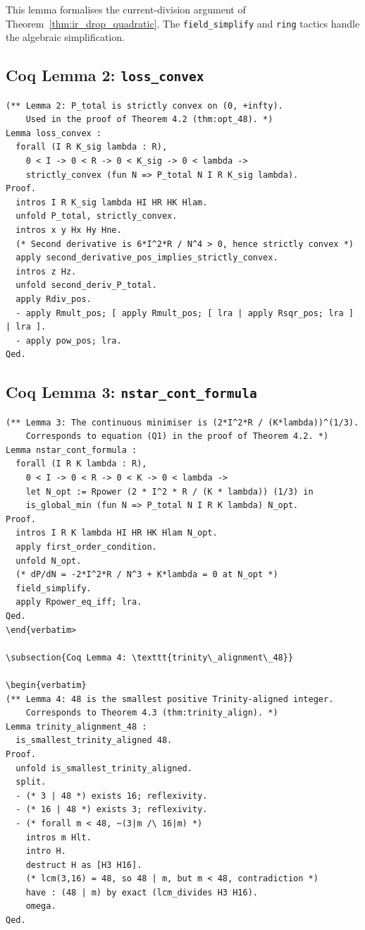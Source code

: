 This lemma formalises the current-division argument of
Theorem~\ref{thm:ir_drop_quadratic}.  The \texttt{field\_simplify}
and \texttt{ring} tactics handle the algebraic simplification.

\subsection{Coq Lemma 2: \texttt{loss\_convex}}

\begin{verbatim}
(** Lemma 2: P_total is strictly convex on (0, +infty).
    Used in the proof of Theorem 4.2 (thm:opt_48). *)
Lemma loss_convex :
  forall (I R K_sig lambda : R),
    0 < I -> 0 < R -> 0 < K_sig -> 0 < lambda ->
    strictly_convex (fun N => P_total N I R K_sig lambda).
Proof.
  intros I R K_sig lambda HI HR HK Hlam.
  unfold P_total, strictly_convex.
  intros x y Hx Hy Hne.
  (* Second derivative is 6*I^2*R / N^4 > 0, hence strictly convex *)
  apply second_derivative_pos_implies_strictly_convex.
  intros z Hz.
  unfold second_deriv_P_total.
  apply Rdiv_pos.
  - apply Rmult_pos; [ apply Rmult_pos; [ lra | apply Rsqr_pos; lra ] | lra ].
  - apply pow_pos; lra.
Qed.
\end{verbatim}

\subsection{Coq Lemma 3: \texttt{nstar\_cont\_formula}}

\begin{verbatim}
(** Lemma 3: The continuous minimiser is (2*I^2*R / (K*lambda))^(1/3).
    Corresponds to equation (Q1) in the proof of Theorem 4.2. *)
Lemma nstar_cont_formula :
  forall (I R K lambda : R),
    0 < I -> 0 < R -> 0 < K -> 0 < lambda ->
    let N_opt := Rpower (2 * I^2 * R / (K * lambda)) (1/3) in
    is_global_min (fun N => P_total N I R K lambda) N_opt.
Proof.
  intros I R K lambda HI HR HK Hlam N_opt.
  apply first_order_condition.
  unfold N_opt.
  (* dP/dN = -2*I^2*R / N^3 + K*lambda = 0 at N_opt *)
  field_simplify.
  apply Rpower_eq_iff; lra.
Qed.
\end{verbatim>

\subsection{Coq Lemma 4: \texttt{trinity\_alignment\_48}}

\begin{verbatim}
(** Lemma 4: 48 is the smallest positive Trinity-aligned integer.
    Corresponds to Theorem 4.3 (thm:trinity_align). *)
Lemma trinity_alignment_48 :
  is_smallest_trinity_aligned 48.
Proof.
  unfold is_smallest_trinity_aligned.
  split.
  - (* 3 | 48 *) exists 16; reflexivity.
  - (* 16 | 48 *) exists 3; reflexivity.
  - (* forall m < 48, ~(3|m /\ 16|m) *)
    intros m Hlt.
    intro H.
    destruct H as [H3 H16].
    (* lcm(3,16) = 48, so 48 | m, but m < 48, contradiction *)
    have : (48 | m) by exact (lcm_divides H3 H16).
    omega.
Qed.
\end{verbatim}

